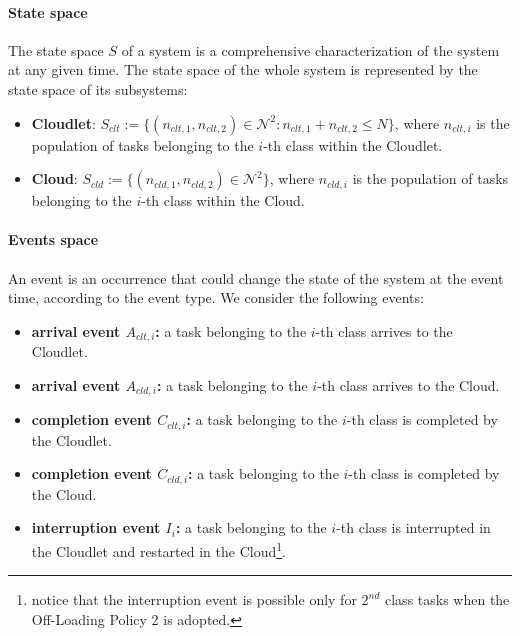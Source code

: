 \paragraph{State space}
The state space $S$ of a system is a comprehensive characterization of the system at any given time.
The state space of the whole system is represented by the state space of its subsystems:

\begin{itemize}
	\item \textbf{Cloudlet}: $S_{clt} := \{(n_{clt,1},n_{clt,2})\in \mathcal{N}^{2}: n_{clt,1}+n_{clt,2}\leq N\}$, where $n_{clt,i}$ is the population of tasks belonging to the $i$-th class within the Cloudlet.
	
	\item \textbf{Cloud}: $S_{cld} := \{(n_{cld,1},n_{cld,2})\in \mathcal{N}^{2}\}$, where $n_{cld,i}$ is the population of tasks belonging to the $i$-th class within the Cloud.
\end{itemize}

\paragraph{Events space}
An event is an occurrence that could change the state of the system at the event time, according to the event type.
We consider the following events:

\begin{itemize}
	\item \textbf{arrival event $A_{clt,i}$:} a task belonging to the $i$-th class arrives to the Cloudlet.
	
	\item \textbf{arrival event $A_{cld,i}$:} a task belonging to the $i$-th class arrives to the Cloud.

	\item \textbf{completion event $C_{clt,i}$:}  a task belonging to the $i$-th class is completed by the Cloudlet.
	
	\item \textbf{completion event $C_{cld,i}$:}  a task belonging to the $i$-th class is completed by the Cloud.
	
	\item \textbf{interruption event $I_{i}$:} a task belonging to the $i$-th class is interrupted in the Cloudlet and restarted in the Cloud\footnote{notice that the interruption event is possible only for $2^{nd}$ class tasks when the Off-Loading Policy 2 is adopted.}.
\end{itemize}

